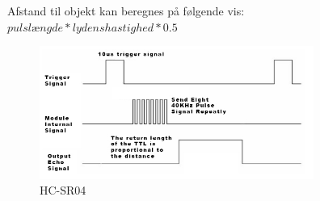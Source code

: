 Afstand til objekt kan beregnes på følgende vis: $pulslængde * lydenshastighed * 0.5$



\begin{figure}[H]
\centering
\includegraphics[width=0.8\textwidth]{Billeder/Afstandsmaler/ultra_schematic.png}
\caption{HC-SR04}
\label{fig:HC-SR04}
\end{figure}










